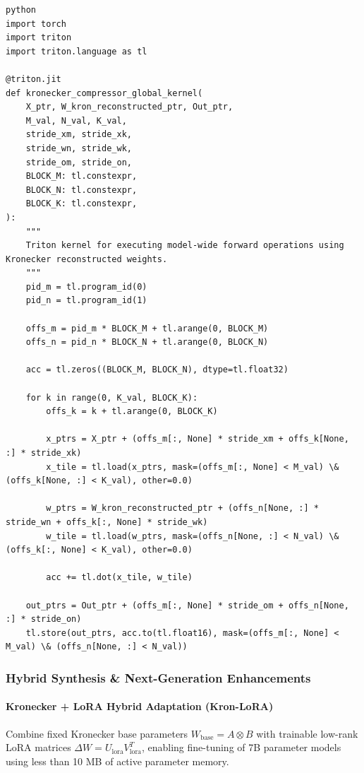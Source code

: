 \vspace{0.5em}
\begin{mdframed}[backgroundcolor=codebg, linecolor=codeframe, linewidth=1pt, roundcorner=4pt, innerleftmargin=2pt, innerrightmargin=5pt, innertopmargin=5pt, innerbottommargin=5pt]
\begin{lstlisting}
python
import torch
import triton
import triton.language as tl

@triton.jit
def kronecker_compressor_global_kernel(
    X_ptr, W_kron_reconstructed_ptr, Out_ptr,
    M_val, N_val, K_val,
    stride_xm, stride_xk,
    stride_wn, stride_wk,
    stride_om, stride_on,
    BLOCK_M: tl.constexpr,
    BLOCK_N: tl.constexpr,
    BLOCK_K: tl.constexpr,
):
    """
    Triton kernel for executing model-wide forward operations using Kronecker reconstructed weights.
    """
    pid_m = tl.program_id(0)
    pid_n = tl.program_id(1)

    offs_m = pid_m * BLOCK_M + tl.arange(0, BLOCK_M)
    offs_n = pid_n * BLOCK_N + tl.arange(0, BLOCK_N)

    acc = tl.zeros((BLOCK_M, BLOCK_N), dtype=tl.float32)

    for k in range(0, K_val, BLOCK_K):
        offs_k = k + tl.arange(0, BLOCK_K)

        x_ptrs = X_ptr + (offs_m[:, None] * stride_xm + offs_k[None, :] * stride_xk)
        x_tile = tl.load(x_ptrs, mask=(offs_m[:, None] < M_val) \& (offs_k[None, :] < K_val), other=0.0)

        w_ptrs = W_kron_reconstructed_ptr + (offs_n[None, :] * stride_wn + offs_k[:, None] * stride_wk)
        w_tile = tl.load(w_ptrs, mask=(offs_n[None, :] < N_val) \& (offs_k[:, None] < K_val), other=0.0)

        acc += tl.dot(x_tile, w_tile)

    out_ptrs = Out_ptr + (offs_m[:, None] * stride_om + offs_n[None, :] * stride_on)
    tl.store(out_ptrs, acc.to(tl.float16), mask=(offs_m[:, None] < M_val) \& (offs_n[None, :] < N_val))
\end{lstlisting}
\end{mdframed}
\vspace{0.5em}


\subsubsection*{Hybrid Synthesis \& Next-Generation Enhancements}

\paragraph{Kronecker + LoRA Hybrid Adaptation (Kron-LoRA)}
Combine fixed Kronecker base parameters $W_{\text{base}} = A \otimes B$ with trainable low-rank LoRA matrices $\Delta W = U_{\text{lora}} V_{\text{lora}}^T$, enabling fine-tuning of 7B parameter models using less than 10 MB of active parameter memory.

